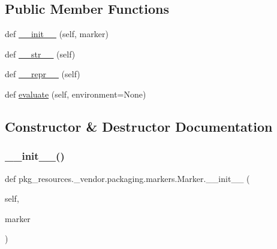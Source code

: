 \subsection*{Public Member Functions}
\begin{DoxyCompactItemize}
\item 
def \hyperlink{classpkg__resources_1_1__vendor_1_1packaging_1_1markers_1_1Marker_a4112abb70d23679a4a1993d4351c29e4}{\+\_\+\+\_\+init\+\_\+\+\_\+} (self, marker)
\item 
def \hyperlink{classpkg__resources_1_1__vendor_1_1packaging_1_1markers_1_1Marker_a9b6c2eb60bc5528b3dd11fe64327f88e}{\+\_\+\+\_\+str\+\_\+\+\_\+} (self)
\item 
def \hyperlink{classpkg__resources_1_1__vendor_1_1packaging_1_1markers_1_1Marker_a01dd3667187696572d93832e420590d6}{\+\_\+\+\_\+repr\+\_\+\+\_\+} (self)
\item 
def \hyperlink{classpkg__resources_1_1__vendor_1_1packaging_1_1markers_1_1Marker_a62689e75e765ae2bcfbd0a166c5f8894}{evaluate} (self, environment=None)
\end{DoxyCompactItemize}


\subsection{Constructor \& Destructor Documentation}
\mbox{\label{classpkg__resources_1_1__vendor_1_1packaging_1_1markers_1_1Marker_a4112abb70d23679a4a1993d4351c29e4}} 
\subsubsection{\texorpdfstring{\+\_\+\+\_\+init\+\_\+\+\_\+()}{\_\_init\_\_()}}
{\footnotesize\ttfamily def pkg\+\_\+resources.\+\_\+vendor.\+packaging.\+markers.\+Marker.\+\_\+\+\_\+init\+\_\+\+\_\+ (\begin{DoxyParamCaption}\item[{}]{self,  }\item[{}]{marker }\end{DoxyParamCaption})}



